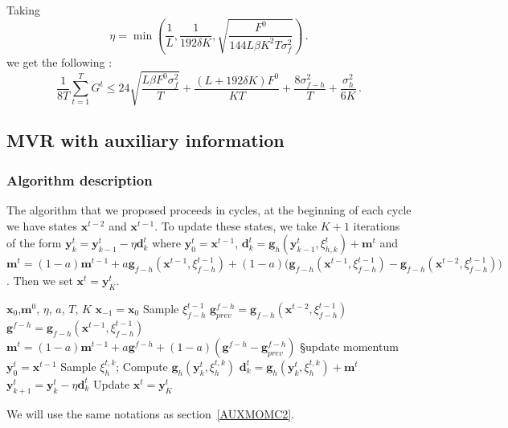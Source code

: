 \documentclass[10pt]{article} %
\theoremstyle{plain}
\theoremstyle{definition}
\theoremstyle{remark}
\def\vd{{\bm{d}}}
\def\vg{{\bm{g}}}
\def\vm{{\bm{m}}}
\def\vx{{\bm{x}}}
\def\vy{{\bm{y}}}
\begin{document}
Taking $$\eta = \min(\frac{1}{L},\frac{1}{192\delta K}, \sqrt{\frac{F^0}{144L\beta K^2T\sigma_f^2}})\, .$$
we get the following :
$$\frac{1}{8T}\sum_{t=1}^T G^t \leq 24 \sqrt{\frac{L\beta F^0\sigma_f^2}{T}} + \frac{(L + 192 \delta K)F^0}{KT} + \frac{8\sigma_{f-h}^2}{T} + \frac{\sigma_h^2}{6K}\, .$$

\subsection{MVR with auxiliary information}
\subsubsection{Algorithm description}\label{app MVR}
The algorithm that we proposed proceeds in cycles, at the beginning of each cycle we have states $\vx^{t-2}$ and $\vx^{t-1}$. To update these states, we take $K+1$ iterations of the form $\vy^t_k = \vy^t_{k-1} - \eta \vd^t_k$ where $\vy^t_0 = \vx^{t-1}$, $\vd^t_k =  \vg_h(\vy^t_{k-1},\xi^t_{h,k}) + \vm^{t}$ and $\vm^t =  (1-a)\vm^{t-1} + a \vg_{f-h}(\vx^{t-1},\xi^{t-1}_{f-h}) + (1 - a)\Big(\vg_{f-h}(\vx^{t-1},\xi^{t-1}_{f-h}) - \vg_{f-h}(\vx^{t-2},\xi^{t-1}_{f-h}))$. Then we set $\vx^t = \vy^t_K$.


\begin{algorithm}[h]
\begin{algorithmic}
\REQUIRE $\vx_0$,$\vm^0$, $\eta$, $a$, $T$, $K$
\STATE $\vx_{-1} = \vx_0$
\STATE  Sample $\xi^{t-1}_{f-h}$
\STATE $\vg^{f-h}_{prev} = \vg_{f-h}(\vx^{t-2},\xi^{t-1}_{f-h})$
\STATE $\vg^{f-h} = \vg_{f-h}(\vx^{t-1},\xi^{t-1}_{f-h})$
\STATE $\vm^{t} = (1-a) \vm^{t-1} + a \vg^{f-h} + (1-a)(\vg^{f-h} - \vg^{f-h}_{prev})$ §update momentum
\STATE $\vy^t_0 = \vx^{t-1}$
\STATE Sample $\xi^{t,k}_h$;\: Compute $\vg_h(\vy^{t}_k,\xi^{t,k}_h)$
\STATE $\vd^t_k = \vg_h(\vy^{t}_k,\xi^{t,k}_h) + \vm^{t} $
\STATE $\vy^t_{k+1} = \vy^t_{k} - \eta \vd^t_k$
\ENDFOR
\STATE Update $\vx^t  = \vy^t_{K}$
\ENDFOR
\end{algorithmic}
\caption{AUXMVR$(f,h)$} 
\label{alg:AUXMVR}
\end{algorithm}

We will use the same notations as section~\ref{AUXMOMC2}.
\end{document}
